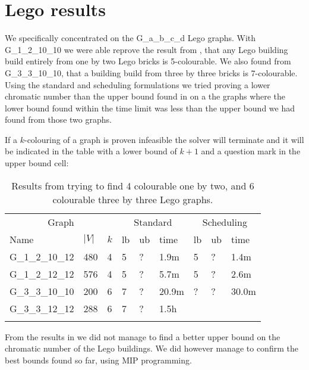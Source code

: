 \section{Lego results}
We specifically concentrated on the G\_a\_b\_c\_d Lego graphs. With G\_1\_2\_10\_10 we were able reprove the result from \cite{Lego}, that any Lego building build entirely from one by two Lego bricks is 5-colourable. We also found from G\_3\_3\_10\_10, that a building build from three by three bricks is 7-colourable. Using the standard and scheduling formulations we tried proving a lower chromatic number than the upper bound found in  on a the graphs where the lower bound found within the time limit was less than the upper bound we had found from those two graphs.

If a $k$-colouring of a graph is proven infeasible the solver will terminate and it will be indicated in the table with a  lower bound of $k+1$ and a question mark in the upper bound cell:

\begin{centering}
\begin{longtable}{|lll|lll|lll|}
\hline
\multicolumn{3}{|c|}{Graph}&\multicolumn{3}{c|}{Standard}&\multicolumn{3}{c|}{Scheduling}\\
Name&$|V|$&$k$&lb&ub&time&lb&ub&time\\
\hline
G\_1\_2\_10\_12&480&4&5&?&1.9m&5&?&1.4m\\
\hline  
G\_1\_2\_12\_12&576&4&5&?&5.7m&5&?&2.6m\\
\hline
G\_3\_3\_10\_10&200&6&7&?&20.9m&?&?&30.0m\\
\hline
G\_3\_3\_12\_12&288&6&7&?&1.5h&\multicolumn{3}{c}{}\\
\cline{1-6}
\caption{Results from trying to find 4 colourable one by two, and 6 colourable three by three Lego graphs.}
\label{table3}
\end{longtable}
\end{centering}
\noindent From the results in  we did not manage to find a better upper bound on the chromatic number of the Lego buildings. We did however manage to confirm the best bounds found so far, using MIP programming.